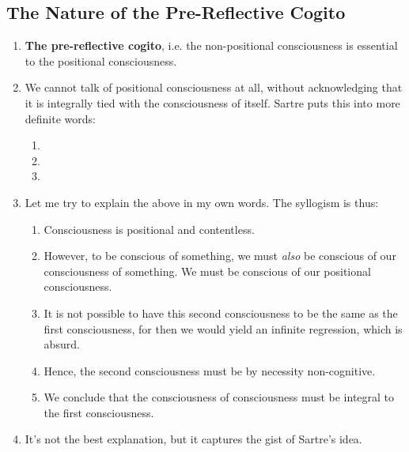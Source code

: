\subsection{The Nature of the Pre-Reflective Cogito}
\begin{enumerate}
  \item \textbf{The pre-reflective cogito}, i.e. the non-positional consciousness is essential to the positional consciousness.
  \item We cannot talk of positional consciousness at all, without acknowledging that it is integrally tied with the consciousness of itself. Sartre puts this into more definite words:
  \begin{enumerate}
    \item {}
    \item {}
    \item {}
  \end{enumerate}
  \item Let me try to explain the above in my own words. The syllogism is thus:
  \begin{enumerate}
    \item Consciousness is positional and contentless.
    \item However, to be conscious of something, we must \emph{also} be conscious of our consciousness of something. We must be conscious of our positional consciousness.
    \item It is not possible to have this second consciousness to be the same as the first consciousness, for then we would yield an infinite regression, which is absurd.
    \item Hence, the second consciousness must be by necessity non-cognitive.
    \item We conclude that the consciousness of consciousness must be integral to the first consciousness.
  \end{enumerate}
  \item It's not the best explanation, but it captures the gist of Sartre's idea.
\end{enumerate}


